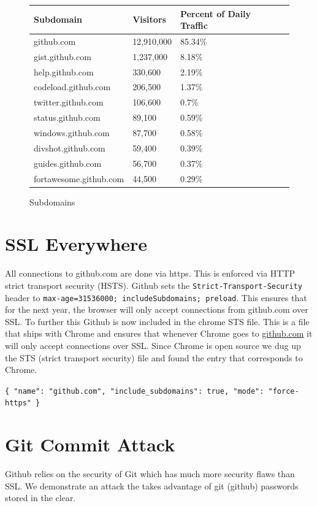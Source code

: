 \documentclass{lposter}
\theoremstyle{plain}
\theoremstyle{definition}
\renewcommand{\tt}[1]{\texttt{#1}}
\begin{document}
\begin{poster}
\begin{figure}
\begin{table}
\begin{tabular}{| l | l | l | l | l | }
Subdomain & Visitors & Percent of Daily Traffic \\ \hline
github.com & 12,910,000 & 85.34\% \\ \hline
gist.github.com & 1,237,000 & 8.18\%  \\ \hline
help.github.com & 330,600 & 2.19\%  \\ \hline
codeload.github.com & 206,500 & 1.37\%  \\ \hline
twitter.github.com & 106,600 & 0.7\%  \\ \hline
status.github.com & 89,100 & 0.59\%  \\ \hline
windows.github.com & 87,700 & 0.58\%  \\ \hline
divshot.github.com & 59,400 & 0.39\%  \\ \hline
guides.github.com & 56,700 & 0.37\%  \\ \hline
fortawesome.github.com & 44,500 & 0.29\%  \\ \hline
\end{tabular}
\end{table}
\caption{Subdomains\newline}
\label{fig:mig_over}
\end{figure}


\section{SSL Everywhere}

All connections to github.com are done via https. This is enforced via HTTP strict transport security (HSTS). Github sets the \tt{Strict-Transport-Security} header to \tt{max-age=31536000; includeSubdomains; preload}. This ensures that for the next year, the browser will only accept connections from github.com over SSL. To further this Github is now included in the chrome STS file. This is a file that ships with Chrome and ensures that whenever Chrome goes to \url{github.com} it will only accept connections over SSL. Since Chrome is open source we dug up the STS (strict transport security) file and found the entry that corresponds to Chrome.

\tt{\{ "name": "github.com", "include\_subdomains": true, "mode": "force-https" \}}


\section{Git Commit Attack}
Github relies on the security of Git which has much more security flaws than SSL. We demonstrate an attack the takes advantage of git (github) passwords stored in the clear.


\end{poster}
\end{document}
